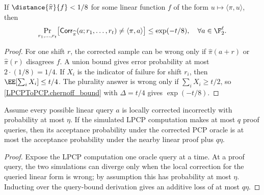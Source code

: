 \begin{lemma}
\label{LPCPToPCP.local_correction}
\leanok
If \(\distance{\widehat{\pi}}{f} < 1 / 8\) for some linear
function \(f\) of the form \(u\mapsto\langle\pi,u\rangle\), then
\[
  \Pr_{r_1,\dots,r_t}\!\left[
    \mathsf{Corr}_{\widehat{\pi}}(a;r_1,\dots,r_t)\neq \langle\pi,a\rangle
  \right]
  \leq \exp(-t/8), \quad \forall a\in\F_2^\ell.
\]
\end{lemma}
\begin{proof}\leanok
For one shift \(r\), the corrected sample can be wrong only if
\(\widehat{\pi}(a+r)\) or \(\widehat{\pi}(r)\) disagrees \(f\). A union bound gives error probability at most
\(2\cdot(1/8)=1/4\). If \(X_i\) is the indicator of failure for shift \(r_i\),
then \(\EE[\sum_i X_i]\le t/4\). The plurality answer is wrong only if
\(\sum_i X_i\ge t/2\), so \ref{LPCPToPCP.chernoff_bound} with
\(\Delta=t/4\) gives \(\exp(-t/8)\).
\end{proof}

\begin{lemma}
\label{LPCPToPCP.corrected_simulation_hybrid}
\leanok
Assume every possible linear query \(a\) is locally corrected incorrectly with
probability at most \(\eta\). If the simulated LPCP computation makes at most
\(q\) proof queries, then its acceptance probability under the corrected PCP
oracle is at most the acceptance probability under the nearby linear proof
plus \(q\eta\).
\end{lemma}
\begin{proof}\leanok
Expose the LPCP computation one oracle query at a time. At a proof query, the
two simulations can diverge only when the local correction for the queried
linear form is wrong; by assumption this has probability at most \(\eta\).
Inducting over the query-bound derivation gives an additive loss of at most
\(q\eta\).
\end{proof}


